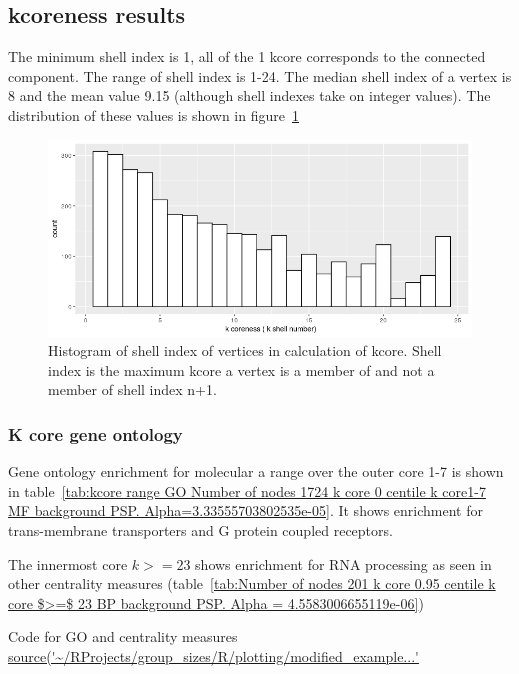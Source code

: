 \subsection{kcoreness results}
 The minimum shell index is 1, all of the 1 kcore corresponds to the connected component. The range of shell index is 1-24. The median shell index of a vertex is 8 and the mean value 9.15 (although shell indexes take on integer values). The distribution of these values is shown in figure~\ref{fig:Kcore_histogram}
 
 \begin{figure}
     \centering
     \includegraphics[width=\textwidth]{images/Rplot01_kcore_hist.png}
     \caption{Histogram of shell index of vertices in calculation of kcore. Shell index is the maximum kcore a vertex is a member of and not a member of shell index n+1. }
     \label{fig:Kcore_histogram}
 \end{figure}
 
 
 \subsubsection{K core gene ontology}
 
 Gene ontology enrichment for molecular  a range over the outer core 1-7 is shown in table~\ref{tab:kcore range GO Number of nodes 1724 k core 0 centile  k core1-7 MF background PSP. Alpha=3.33555703802535e-05}. It shows enrichment for trans-membrane transporters and G protein coupled receptors. 
 
 The innermost core $k>=23$ shows enrichment for RNA processing as seen in other centrality measures (table~\ref{tab:Number of nodes 201 k core 0.95 centile  k core $>=$ 23 BP background PSP. Alpha = 4.5583006655119e-06})

Code for GO and centrality measures \url{source('~/RProjects/group_sizes/R/plotting/modified_example...'} 
 
